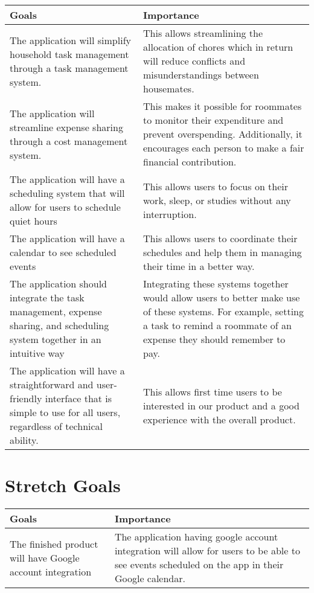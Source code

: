 \documentclass{article}
\begin{document}
\begin{center}
\begin{tabular}{|p{6cm}|p{6cm}|}
\hline
\textbf{Goals} & \textbf{Importance}\\

\hline
The application will simplify household task management through a task management system. & This allows streamlining the allocation of chores which in return will reduce conflicts and misunderstandings between housemates. \\
\hline
The application will streamline expense sharing through a cost management system. & This makes it possible for roommates to monitor their expenditure and prevent overspending. Additionally, it encourages each person to make a fair financial contribution. \\
\hline
The application will have a scheduling system that will allow for users to schedule quiet hours & This allows users to focus on their work, sleep, or studies without any interruption. \\
\hline
The application will have a calendar to see scheduled events & This allows users to coordinate their schedules and help them in managing their time in a better way. \\
\hline
The application should integrate the task management, expense sharing, and scheduling system together in an intuitive way  & Integrating these systems together would allow users to better make use of these systems. For example, setting a task to remind a roommate of an expense they should remember to pay. \\
\hline The application will have a straightforward and user-friendly interface that is simple to use for all users, regardless of technical ability. & This allows first time users to be interested in our product and a good experience with the overall product. \\
\hline
\end{tabular}
\end{center}

\section{Stretch Goals}

\begin{center}
\begin{tabular}{|p{6cm}|p{6cm}|}
\hline
\textbf{Goals} & \textbf{Importance}\\
\hline
The finished product will have Google account integration &  The application having google account integration will allow for users to be able to see events scheduled on the app in their Google calendar.\\
\hline
\end{tabular}
\end{center}
\end{document}
